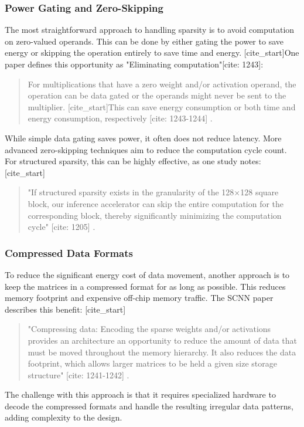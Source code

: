     \subsubsection{Power Gating and Zero-Skipping} \label{sec: power-gating}
    The most straightforward approach to handling sparsity is to avoid computation on zero-valued operands. This can be done by either gating the power to save energy or skipping the operation entirely to save time and energy. [cite_start]One paper defines this opportunity as "Eliminating computation"[cite: 1243]:
    \blockquote{For multiplications that have a zero weight and/or activation operand, the operation can be data gated or the operands might never be sent to the multiplier. [cite_start]This can save energy consumption or both time and energy consumption, respectively [cite: 1243-1244] \cite{parashar_scnn_2017}.}
    While simple data gating saves power, it often does not reduce latency. More advanced zero-skipping techniques aim to reduce the computation cycle count. For structured sparsity, this can be highly effective, as one study notes:
    [cite_start]\blockquote{"If structured sparsity exists in the granularity of the 128×128 square block, our inference accelerator can skip the entire computation for the corresponding block, thereby significantly minimizing the computation cycle" [cite: 1205] \cite{kim_fpga_2021}.}

    \subsubsection{Compressed Data Formats} \label{sec: compressed}
    To reduce the significant energy cost of data movement, another approach is to keep the matrices in a compressed format for as long as possible. This reduces memory footprint and expensive off-chip memory traffic. The SCNN paper describes this benefit:
    [cite_start]\blockquote{"Compressing data: Encoding the sparse weights and/or activations provides an architecture an opportunity to reduce the amount of data that must be moved throughout the memory hierarchy. It also reduces the data footprint, which allows larger matrices to be held a given size storage structure" [cite: 1241-1242] \cite{parashar_scnn_2017}.}
    The challenge with this approach is that it requires specialized hardware to decode the compressed formats and handle the resulting irregular data patterns, adding complexity to the design.

